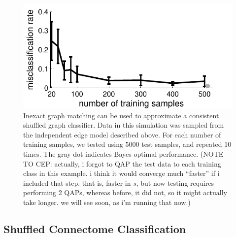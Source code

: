 \begin{figure}[htbp]
	\centering
		\includegraphics[width=1.0\linewidth]{../figs/hetero_easy_n10_MC5000_QAP_vs_n.pdf}
	\caption{Inexact graph matching can be used to approximate a consistent shuffled graph classifier.  Data in this simulation was sampled from the independent edge model described above.  For each number of training samples, we tested using 5000 test samples, and repeated 10 times.  The gray dot indicates Bayes optimal performance. (NOTE TO CEP: actually, i forgot to QAP the test data to each training class in this example.  i think it would converge much ``faster'' if i included that step. that is, faster in $s$, but now testing requires performing 2 QAPs, whereas before, it did not, so it might actually take longer.  we will see soon, as i'm running that now.)}
	\label{fig:1}
\end{figure}






\subsection{Shuffled Connectome Classification} %
\label{sub:connectome_classification}

